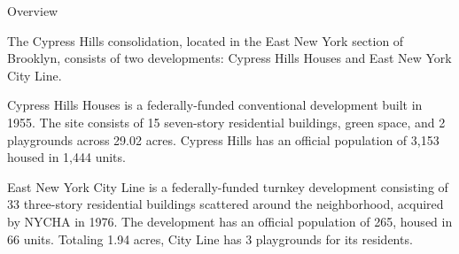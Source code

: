 Overview 

The Cypress Hills consolidation, located in the East New York section of Brooklyn, consists of two developments: Cypress Hills Houses and East New York City Line. 

Cypress Hills Houses is a federally-funded conventional development built in 1955. The site consists of 15 seven-story residential buildings, green space, and 2 playgrounds across 29.02 acres. Cypress Hills has an official population of 3,153 housed in 1,444 units. 

East New York City Line is a federally-funded turnkey development consisting of 33 three-story residential buildings scattered around the neighborhood, acquired by NYCHA in 1976. The development has an official population of 265, housed in 66 units. Totaling 1.94 acres, City Line has 3 playgrounds for its residents. 